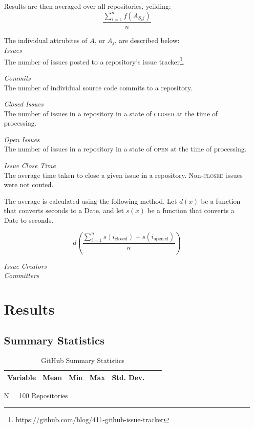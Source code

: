 \documentclass{proc}
\begin{document}
Results are then averaged over all repositories, yeilding:
\[ \frac{\sum\limits_{i=1}^{n} f(  A_{S{_i}j}  ) } {n} \]

The individual attrubites of $A$, or $A_j$, are described below:\\
\textit{Issues}\\
The number of issues posted to a repository's issue tracker\footnote{https://github.com/blog/411-github-issue-tracker}.

\textit{Commits}\\
The number of individual source code commits to a repository.

\textit{Closed Issues}\\
The number of issues in a repository in a state of \textsc{closed} at the time of processing.

\textit{Open Issues}\\
The number of issues in a repository in a state of \textsc{open} at the time of processing.

\textit{Issue Close Time}\\
The average time taken to close a given issue in a repository. Non-\textsc{closed} issues were not couted.

The average is calculated using the following method. Let $d(x)$ be a function that converts seconds to a Date, and let $s(x)$ be a function that converts a Date to seconds.

\[ d\left( \frac{\sum\limits_{i=1}^{n} s(i_{\textrm{closed}}) - s(i_{\textrm{opened}})  } {n} \right) \]

\textit{Issue Creators}\\

\textit{Committers}\\


\section{Results}

\subsection{Summary Statistics}
\begin{table}[!ht]
\begin{center}
\begin{tabular}{rrrrrrr}
\hline
Variable & Mean & Min & Max & Std. Dev. \\
\hline

\hline
\end{tabular}
N = 100 Repositories
\caption{GitHub Summary Statistics}
\label{table:summary_stats}
\end{center}
\end{table}
\end{document}

